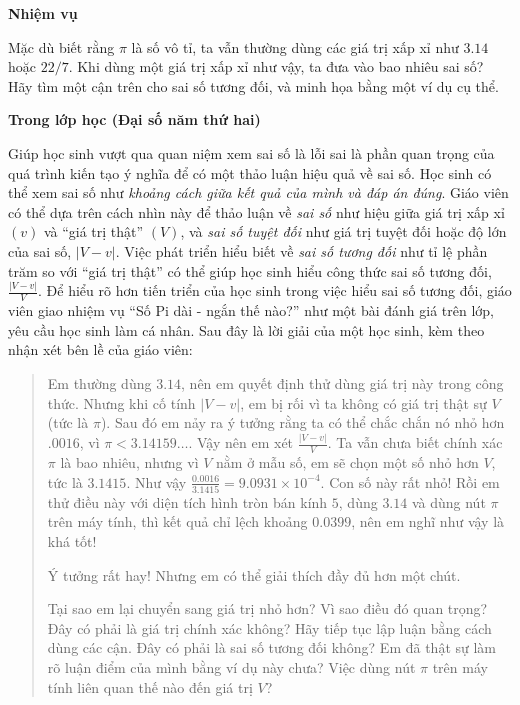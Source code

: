   {
    \textbf{Nhiệm vụ}

    Mặc dù biết rằng $\pi$ là số vô tỉ, ta vẫn thường dùng các giá trị xấp xỉ như $3.14$ hoặc $22/7$. Khi dùng một giá trị xấp xỉ như vậy, ta đưa vào bao nhiêu sai số? Hãy tìm một cận trên cho sai số tương đối, và minh họa bằng một ví dụ cụ thể.

    \textbf{Trong lớp học (Đại số năm thứ hai)}

    Giúp học sinh vượt qua quan niệm xem sai số là lỗi sai là phần quan trọng của quá trình kiến tạo ý nghĩa để có một thảo luận hiệu quả về sai số. Học sinh có thể xem sai số như \emph{khoảng cách giữa kết quả của mình và đáp án đúng}. Giáo viên có thể dựa trên cách nhìn này để thảo luận về \emph{sai số} như hiệu giữa giá trị xấp xỉ $(v)$ và ``giá trị thật'' $(V)$, và \emph{sai số tuyệt đối} như giá trị tuyệt đối hoặc độ lớn của sai số, $\lvert V - v\rvert$. Việc phát triển hiểu biết về \emph{sai số tương đối} như tỉ lệ phần trăm so với ``giá trị thật'' có thể giúp học sinh hiểu công thức sai số tương đối, $\frac{\lvert V - v\rvert}{V}$. Để hiểu rõ hơn tiến triển của học sinh trong việc hiểu sai số tương đối, giáo viên giao nhiệm vụ ``Số Pi dài - ngắn thế nào?'' như một bài đánh giá trên lớp, yêu cầu học sinh làm cá nhân. Sau đây là lời giải của một học sinh, kèm theo nhận xét bên lề của giáo viên:

    \begin{quote}
      Em thường dùng $3.14$, nên em quyết định thử dùng giá trị này trong công thức. Nhưng khi cố tính $\lvert V - v\rvert$, em bị rối vì ta không có giá trị thật sự $V$ (tức là $\pi$). Sau đó em nảy ra ý tưởng rằng ta có thể chắc chắn nó nhỏ hơn $.0016$, vì $\pi < 3.14159\dots$. Vậy nên em xét $\frac{\lvert V - v\rvert}{V}$. Ta vẫn chưa biết chính xác $\pi$ là bao nhiêu, nhưng vì $V$ nằm ở mẫu số, em sẽ chọn một số nhỏ hơn $V$, tức là $3.1415$. Như vậy $\frac{0.0016}{3.1415}=9.0931\times 10^{-4}$. Con số này rất nhỏ! Rồi em thử điều này với diện tích hình tròn bán kính $5$, dùng $3.14$ và dùng nút $\pi$ trên máy tính, thì kết quả chỉ lệch khoảng $0.0399$, nên em nghĩ như vậy là khá tốt!

      \begin{scriptlist}
        \item[Giáo viên:] Ý tưởng rất hay! Nhưng em có thể giải thích đầy đủ hơn một chút.

        \item[Giáo viên:] Tại sao em lại chuyển sang giá trị nhỏ hơn? Vì sao điều đó quan trọng? Đây có phải là giá trị chính xác không? Hãy tiếp tục lập luận bằng cách dùng các cận. Đây có phải là sai số tương đối không? Em đã thật sự làm rõ luận điểm của mình bằng ví dụ này chưa? Việc dùng nút $\pi$ trên máy tính liên quan thế nào đến giá trị $V$?
      \end{scriptlist}
    \end{quote}

}

